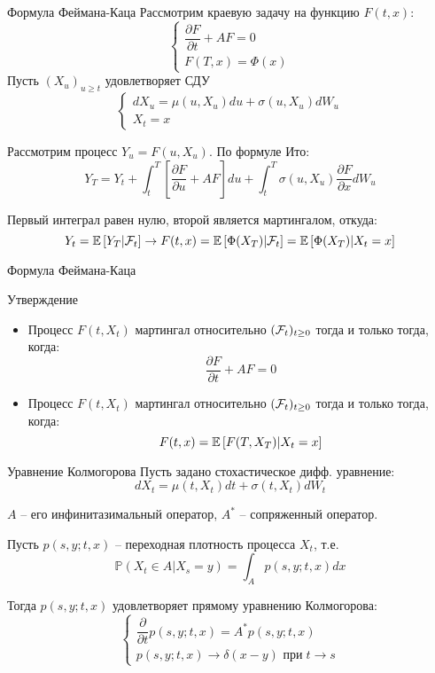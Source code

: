 \documentclass{beamer}
\begin{document}
\begin{frame}{Формула Феймана-Каца}
    Рассмотрим краевую задачу на функцию $F(t, x)$:
    $$\begin{cases}
        \dfrac{\partial F}{\partial t}+AF = 0 \\
        F(T, x) = \Phi(x)
    \end{cases}
    $$
    Пусть $(X_u)_{u \geq t}$ удовлетворяет СДУ     $$
        \begin{cases}
            dX_u = \mu(u, X_u) du + \sigma(u, X_u) dW_u
            \\
            X_t = x
        \end{cases}
    $$

    Рассмотрим процесс $Y_u = F(u, X_u)$. По формуле Ито:
    $$
        Y_T = Y_t + \int_t^T \left[\dfrac{\partial F}{\partial u}+AF\right]du + \int_t^T \sigma(u, X_u) \dfrac{\partial F}{\partial x} dW_u
    $$

    Первый интеграл равен нулю, второй является мартингалом, откуда:
    $$
        Y_t = \mathbb{E} \left[ Y_T | \mathcal{F}_t\right] \to F(t, x) = \mathbb{E} \left[ \Phi(X_T) | \mathcal{F}_t\right] = \mathbb{E} \left[ \Phi(X_T) | X_t=x\right] 
    $$
\end{frame}

\begin{frame}{Формула Феймана-Каца}
    \begin{block}{Утверждение}
    \begin{itemize}
        \item         Процесс $F(t, X_t)$ мартингал относительно $(\mathcal{F}_t)_{t\geq0}$ тогда и только тогда, когда:
        $$
            \dfrac{\partial F}{\partial t}+AF = 0
        $$
        \item         Процесс $F(t, X_t)$ мартингал относительно $(\mathcal{F}_t)_{t\geq0}$ тогда и только тогда, когда:
        $$
            F(t,x)=\mathbb{E} \left[ F(T,X_T) | X_t=x\right] 
        $$
    \end{itemize}

    \end{block}
\end{frame}

\begin{frame}{Уравнение Колмогорова}
        Пусть задано стохастическое дифф. уравнение:
    $$
        dX_t = \mu(t, X_t) dt + \sigma(t, X_t) dW_t
    $$

    $A$ -- его инфинитазимальный оператор, $A^*$ -- сопряженный оператор. 

    Пусть $p(s, y; t, x)$ -- переходная плотность процесса $X_t$, т.е.
    $$
        \mathbb{P}( X_t \in A | X_s = y) = \int_A p(s, y; t, x) dx
    $$

    Тогда $p(s, y; t, x)$ удовлетворяет прямому уравнению Колмогорова:
    $$ 
    \begin{cases}
        \dfrac{\partial }{\partial t} p(s, y; t, x) = A^* p(s, y; t, x)\\
        p(s, y; t, x) \to \delta(x-y) \text{ при} \; t\to s
    \end{cases}
        
    $$
\end{frame}
\end{document}
